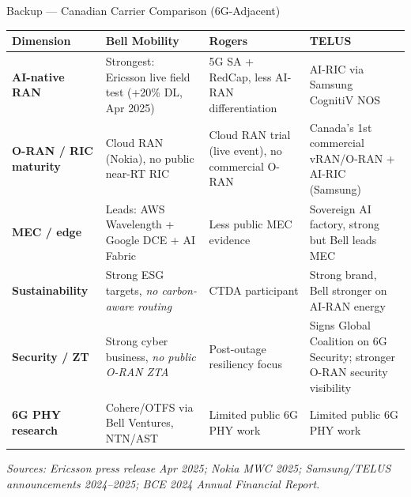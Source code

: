 \documentclass[aspectratio=169, 11pt]{beamer}
\begin{document}
\begin{frame}[label=backup-carriers]{Backup — Canadian Carrier Comparison (6G-Adjacent)}

\centering
\renewcommand{\arraystretch}{1.3}
\scriptsize
\begin{tabularx}{\linewidth}{>{\bfseries}p{3.2cm} X X X}
\toprule
\textbf{Dimension} & \textbf{Bell Mobility} & \textbf{Rogers} & \textbf{TELUS} \\
\midrule
AI-native RAN & \cellcolor{polygreen!20}Strongest: Ericsson live field test (+20\% DL, Apr 2025) & 5G SA + RedCap, less AI-RAN differentiation & AI-RIC via Samsung CognitiV NOS \\
O-RAN / RIC maturity & Cloud RAN (Nokia), no public near-RT RIC & Cloud RAN trial (live event), no commercial O-RAN & \cellcolor{polygreen!20}Canada's 1st commercial vRAN/O-RAN + AI-RIC (Samsung) \\
MEC / edge & \cellcolor{polygreen!20}Leads: AWS Wavelength + Google DCE + AI Fabric & Less public MEC evidence & Sovereign AI factory, strong but Bell leads MEC \\
Sustainability & Strong ESG targets, \textit{no carbon-aware routing} & CTDA participant & Strong brand, Bell stronger on AI-RAN energy \\
Security / ZT & Strong cyber business, \textit{no public O-RAN ZTA} & Post-outage resiliency focus & Signs Global Coalition on 6G Security; stronger O-RAN security visibility \\
6G PHY research & Cohere/OTFS via Bell Ventures, NTN/AST & Limited public 6G PHY work & Limited public 6G PHY work \\
\bottomrule
\end{tabularx}

\vspace{4pt}
{\footnotesize\textit{Sources: Ericsson press release Apr 2025; Nokia MWC 2025; Samsung/TELUS announcements 2024–2025; BCE 2024 Annual Financial Report.}}

\end{frame}
\end{document}

